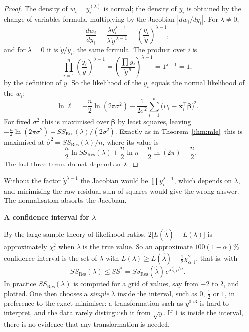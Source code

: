 \documentclass[11pt,a4paper]{article}
\numberwithin{equation}{section}
\theoremstyle{definition}
\newcommand{\subhead}[1]{%
  \par\medskip\noindent\textbf{#1}\par\nobreak\smallskip}
\begin{document}
\begin{proof}
The density of $w_i = y_i^{(\lambda)}$ is normal; the density of $y_i$ is obtained by the change
of variables formula, multiplying by the Jacobian $|dw_i/dy_i|$. For $\lambda \neq 0$,
\[
\frac{dw_i}{dy_i} = \frac{\lambda y_i^{\lambda - 1}}{\lambda\,\dot y^{\,\lambda - 1}} = \left(\frac{y_i}{\dot y}\right)^{\lambda - 1} ,
\]
and for $\lambda = 0$ it is $\dot y/y_i$, the same formula. The product over $i$ is
\[
\prod_{i=1}^n\left(\frac{y_i}{\dot y}\right)^{\lambda - 1} = \left(\frac{\prod y_i}{\dot y^{\,n}}\right)^{\lambda - 1} = 1^{\lambda - 1} = 1 ,
\]
by the definition of $\dot y$. So the likelihood of the $y_i$ equals the normal likelihood of
the $w_i$:
\[
\ln\ell = -\frac{n}{2}\ln(2\pi\sigma^2) - \frac{1}{2\sigma^2}\sum_{i=1}^n\bigl(w_i - \mathbf{x}_i^\top\boldsymbol\beta\bigr)^2 .
\]
For fixed $\sigma^2$ this is maximised over $\boldsymbol\beta$ by least squares, leaving
$-\frac{n}{2}\ln(2\pi\sigma^2) - SS_{\mathrm{Res}}(\lambda)/(2\sigma^2)$. Exactly as in
Theorem~\ref{thm:mle}, this is maximised at $\hat\sigma^2 = SS_{\mathrm{Res}}(\lambda)/n$, where its value is
\[
-\frac{n}{2}\ln SS_{\mathrm{Res}}(\lambda) + \frac{n}{2}\ln n - \frac{n}{2}\ln(2\pi) - \frac{n}{2} .
\]
The last three terms do not depend on $\lambda$.
\end{proof}

Without the factor $\dot y^{\lambda - 1}$ the Jacobian would be $\prod y_i^{\lambda - 1}$, which
depends on $\lambda$, and minimising the raw residual sum of squares would give the wrong answer.
The normalisation absorbs the Jacobian.

\subhead{A confidence interval for $\lambda$}
By the large-sample theory of likelihood ratios, $2\bigl[L(\hat\lambda) - L(\lambda)\bigr]$ is
approximately $\chi^2_1$ when $\lambda$ is the true value. So an approximate $100(1 - \alpha)\%$
confidence interval is the set of $\lambda$ with $L(\lambda) \ge L(\hat\lambda) - \frac12\chi^2_{\alpha,1}$, that is,
with
\[
SS_{\mathrm{Res}}(\lambda) \le SS^* = SS_{\mathrm{Res}}(\hat\lambda)\, e^{\chi^2_{\alpha,1}/n} .
\]
In practice $SS_{\mathrm{Res}}(\lambda)$ is computed for a grid of values, say from $-2$ to $2$, and
plotted. One then chooses a \emph{simple} $\lambda$ inside the interval, such as $0$, $\frac12$ or $1$,
in preference to the exact minimiser: a transformation such as $y^{0.43}$ is hard to interpret,
and the data rarely distinguish it from $\sqrt{y}$. If $1$ is inside the interval, there is no
evidence that any transformation is needed.
\end{document}
